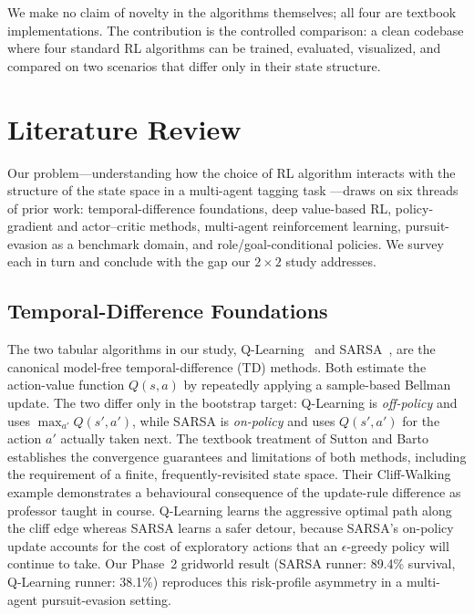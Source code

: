 \documentclass[conference]{IEEEtran}
\begin{document}
We make no claim of novelty in the algorithms themselves; all four are
textbook implementations. The contribution is the controlled comparison: a
clean codebase where four standard RL algorithms can be trained, evaluated,
visualized, and compared on two scenarios that differ only in their state
structure.

\section{Literature Review}\label{sec:litreview}

Our problem---understanding how the choice of RL algorithm
interacts with the structure of the state space in a multi-agent
tagging task ---draws on six threads
of prior work: temporal-difference foundations, deep value-based RL,
policy-gradient and actor--critic methods, multi-agent reinforcement
learning, pursuit-evasion as a benchmark domain, and role/goal-conditional
policies. We survey each in turn and conclude with the gap our
$2{\times}2$ study addresses.

\subsection{Temporal-Difference Foundations}

The two tabular algorithms in our study, Q-Learning~\cite{watkins1989}
and SARSA~\cite{rummery1994}, are the canonical model-free
temporal-difference (TD) methods. Both estimate the action-value
function $Q(s,a)$ by repeatedly applying a sample-based Bellman
update. The two differ only in the bootstrap target: Q-Learning is
\emph{off-policy} and uses $\max_{a'} Q(s', a')$, while SARSA is
\emph{on-policy} and uses $Q(s', a')$ for the action $a'$ actually
taken next. The textbook treatment of Sutton and Barto~\cite{sutton2018}
establishes the convergence guarantees and limitations of both methods,
including the requirement of a finite, frequently-revisited state
space. Their Cliff-Walking example demonstrates a behavioural
consequence of the update-rule difference as professor taught in course. Q-Learning learns the aggressive optimal path along the cliff edge whereas SARSA learns a safer detour, because
SARSA's on-policy update accounts for the cost of exploratory actions
that an $\epsilon$-greedy policy will continue to take. Our Phase~2
gridworld result (SARSA runner: 89.4\% survival, Q-Learning runner:
38.1\%) reproduces this risk-profile asymmetry in a multi-agent
pursuit-evasion setting.
\end{document}
